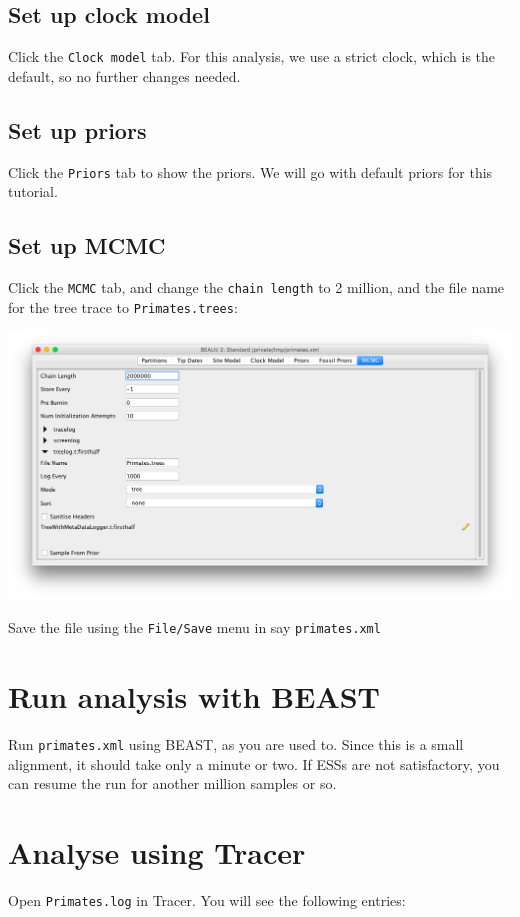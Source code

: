 \documentclass{article}
\begin{document}
\subsection*{Set up clock model}
Click the {\tt Clock model} tab. For this analysis, we use a strict clock, which is the default, so no further changes needed.
\subsection*{Set up priors}
Click the {\tt Priors} tab to show the priors. We will go with default priors for this tutorial.
\subsection*{Set up MCMC}
Click the {\tt MCMC} tab, and change the {\tt chain length} to 2 million, and the file name for the tree trace to {\tt Primates.trees}:

\includegraphics[width=\textwidth]{BEAUti_mcmc}

Save the file using the {\tt File/Save} menu in say {\tt primates.xml}

\section*{Run analysis with BEAST}
Run {\tt primates.xml} using BEAST, as you are used to. Since this is a small alignment, it should take only a minute or two. If ESSs are not satisfactory, you can resume the run for another million samples or so.

\section*{Analyse using Tracer}

Open {\tt Primates.log} in Tracer. You will see the following entries:
\end{document}
